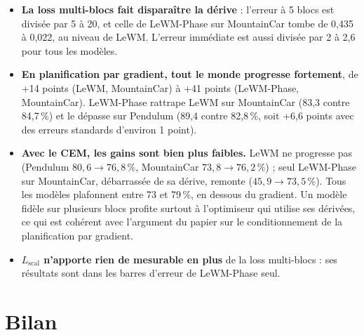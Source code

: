 \documentclass[11pt,a4paper]{article}
\newcommand{\Lscal}{L_{\mathrm{scal}}}
\begin{document}
\begin{itemize}
  \item \textbf{La loss multi-blocs fait disparaître la dérive} : l'erreur à 5 blocs est divisée
  par 5 à 20, et celle de LeWM-Phase sur MountainCar tombe de 0,435 à 0,022, au niveau de LeWM.
  L'erreur immédiate est aussi divisée par 2 à 2,6 pour tous les modèles.
  \item \textbf{En planification par gradient, tout le monde progresse fortement}, de +14 points
  (LeWM, MountainCar) à +41 points (LeWM-Phase, MountainCar). LeWM-Phase rattrape LeWM sur MountainCar
  (83,3 contre 84,7\,\%) et le dépasse sur Pendulum (89,4 contre 82,8\,\%, soit +6,6 points
  avec des erreurs standards d'environ 1 point).
  \item \textbf{Avec le CEM, les gains sont bien plus faibles.} LeWM ne progresse pas
  (Pendulum $80{,}6 \to 76{,}8\,\%$, MountainCar $73{,}8 \to 76{,}2\,\%$) ; seul LeWM-Phase sur
  MountainCar, débarrassée de sa dérive, remonte ($45{,}9 \to 73{,}5\,\%$). Tous les modèles
  plafonnent entre 73 et 79\,\%, en dessous du gradient. Un modèle fidèle sur plusieurs blocs
  profite surtout à l'optimiseur qui utilise ses dérivées, ce qui est cohérent avec l'argument
  du papier sur le conditionnement de la planification par gradient.
  \item \textbf{$\Lscal$ n'apporte rien de mesurable en plus} de la loss multi-blocs : ses
  résultats sont dans les barres d'erreur de LeWM-Phase seul.
\end{itemize}

\section{Bilan}
\end{document}
